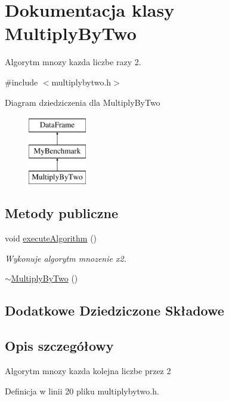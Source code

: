 \hypertarget{class_multiply_by_two}{\section{Dokumentacja klasy Multiply\-By\-Two}
\label{class_multiply_by_two}
}


Algorytm mnozy kazda liczbe razy 2.  




{\ttfamily \#include $<$multiplybytwo.\-h$>$}

Diagram dziedziczenia dla Multiply\-By\-Two\begin{figure}[H]
\begin{center}
\leavevmode
\includegraphics[height=3.000000cm]{class_multiply_by_two}
\end{center}
\end{figure}
\subsection*{Metody publiczne}
\begin{DoxyCompactItemize}
\item 
void \hyperlink{class_multiply_by_two_aad2080a1fdab088814170e529a14db1e}{execute\-Algorithm} ()
\begin{DoxyCompactList}\small\item\em Wykonuje algorytm mnozenie x2. \end{DoxyCompactList}\item 
\hyperlink{class_multiply_by_two_ab84d2c946e0ac7d6eeef32d5800ce4a5}{$\sim$\-Multiply\-By\-Two} ()
\end{DoxyCompactItemize}
\subsection*{Dodatkowe Dziedziczone Składowe}


\subsection{Opis szczegółowy}
Algorytm mnozy kazda kolejna liczbe przez 2 

Definicja w linii 20 pliku multiplybytwo.\-h.



